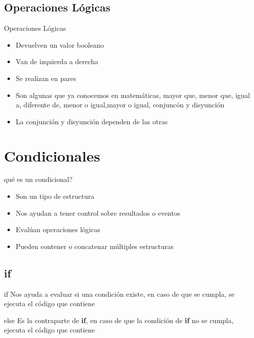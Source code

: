 \documentclass{beamer}
\begin{document}
	\subsection{Operaciones L\'ogicas}
	
	\begin{frame}{Operaciones L\'ogicas}
		\begin{itemize}
			\item Devuelven un valor booleano
			\item Van de izquierda a derecha
			\item Se realizan en pares
			\item Son algunas que ya conocemos en matem\'aticas, mayor que, menor que, igual a, diferente de, menor o igual,mayor o igual, conjunc\'on y disyunci\'on
			\item La conjunci\'on y disyunci\'on dependen de las otras
		\end{itemize}
	\end{frame}
	
	\section{Condicionales}
	
	\begin{frame}{\textquestiondown qu\'e es un condicional?}
		\begin{itemize}
			\item Son un tipo de estructura
			\item Nos ayudan a tener control sobre resultados o eventos
			\item Eval\'uan operaciones l\'ogicas
			\item Pueden contener o concatenar m\'ultiples estructuras
		\end{itemize}
	\end{frame}
	
	\subsection{if}
	
	\begin{frame}{if}
		Nos ayuda a evaluar si una condici\'on existe, en caso de que se cumpla, se ejecuta el c\'odigo que contiene
	\end{frame}
	
	\begin{frame}{else}
		Es la contraparte de \textbf{if}, en caso de que la condici\'on de \textbf{if} no se cumpla, ejecuta el c\'odigo que contiene
	\end{frame}
	
\end{document}
